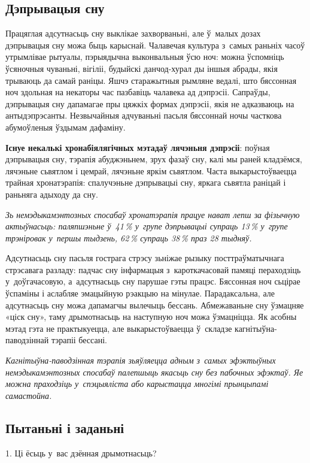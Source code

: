 \subsection*{Дэпрывацыя сну}

Працяглая адсутнасьць сну выклікае захворваньні, але ў~малых дозах дэпрывацыя сну можа быць карыснай. Чалавечая культура з~самых раньніх часоў утрымлівае рытуалы, пэрыядычна выконвальныя ўсю ноч: можна ўспомніць ўсяночныя чуваньні, вігіліі, будыйскі данчод-хурал ды іншыя абрады, якія трываюць да самай раніцы. Яшчэ старажытныя рымляне ведалі, што бяссонная ноч здольная на некаторы час пазбавіць чалавека ад дэпрэсіі. Сапраўды, дэпрывацыя сну дапамагае пры цяжкіх формах дэпрэсіі, якія не адказваюць на антыдэпрэсанты. Незвычайныя адчуваньні пасьля бяссоннай ночы часткова абумоўленыя ўздымам дафаміну.

\textbf{Існуе некалькі хронабіялягічных мэтадаў лячэньня дэпрэсіі}: поўная дэпрывацыя сну, тэрапія абуджэньнем, зрух фазаў сну, калі мы раней кладзёмся, лячэньне сьвятлом і цемрай, лячэньне яркім сьвятлом. Часта выкарыстоўваецца трайная хронатэрапія: спалучэньне дэпрывацыі сну, яркага сьвятла раніцай і раньняга адыходу да сну. 

\emph{Зь немэдыкамэнтозных спосабаў хронатэрапія працуе нават лепш за фізычную актыўнасьць: паляпшэньне ў~41\,\% у~групе дэпрывацыі супраць 13\,\% у~групе трэніровак у~першы тыдзень, 62\,\% супраць 38\,\% праз 28 тыдняў.}

Адсутнасьць сну пасьля гострага стрэсу зьніжае рызыку посттраўматычнага стрэсавага разладу: падчас сну інфармацыя з~кароткачасовай памяці пераходзіць у~доўгачасовую, а~адсутнасьць сну парушае гэты працэс. Бяссонная ноч сьцірае ўспаміны і аслабляе эмацыйную рэакцыю на мінулае. Парадаксальна, але адсутнасьць сну можа дапамагчы вылечыць бессань. Абмежаваньне сну ўзмацняе «ціск сну», таму дрымотнасьць на наступную ноч можа ўзмацніцца. Як асобны мэтад гэта не практыкуецца, але выкарыстоўваецца ў~складзе кагнітыўна-паводзіннай тэрапіі бессані.

\emph{Кагнітыўна-паводзінная тэрапія зьяўляецца адным з~самых эфэктыўных немэдыкамэнтозных спосабаў палепшыць якасьць сну без пабочных эфэктаў. Яе можна праходзіць у~спэцыяліста або карыстацца многімі прынцыпамі самастойна.}

\subsection*{Пытаньні і заданьні}

1. Ці ёсьць у~вас дзённая дрымотнасьць?

